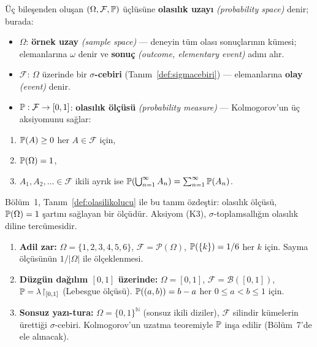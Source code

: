 \begin{tanim}\label{def:olasilikuzayi}
Üç bileşenden oluşan $(\Omega, \mathcal{F}, \mathbb{P})$ üçlüsüne
\textbf{olasılık uzayı} \emph{(probability space)} denir; burada:
\begin{itemize}
  \item $\Omega$: \textbf{örnek uzay} \emph{(sample space)} --- deneyin tüm
        olası sonuçlarının kümesi; elemanlarına $\omega$ denir ve
        \textbf{sonuç} \emph{(outcome, elementary event)} adını alır.
  \item $\mathcal{F}$: $\Omega$ üzerinde bir \textbf{$\sigma$-cebiri}
        (Tanım~\ref{def:sigmacebiri}) --- elemanlarına \textbf{olay} \emph{(event)} denir.
  \item $\mathbb{P}: \mathcal{F} \to [0,1]$: \textbf{olasılık ölçüsü}
        \emph{(probability measure)} --- Kolmogorov'un üç aksiyomunu sağlar:
\end{itemize}
\begin{enumerate}[label=\textbf{(K\arabic*)}]
  \item $\mathbb{P}(A) \geq 0$ her $A \in \mathcal{F}$ için,
  \item $\mathbb{P}(\Omega) = 1$,
  \item $A_1, A_2, \ldots \in \mathcal{F}$ ikili ayrık ise
        $\mathbb{P}\!\left(\bigcup_{n=1}^\infty A_n\right) = \sum_{n=1}^\infty \mathbb{P}(A_n)$.
\end{enumerate}
\end{tanim}

\begin{notkutu}
Bölüm~1, Tanım~\ref{def:olasilikolucu} ile bu tanım özdeştir: olasılık ölçüsü,
$\mathbb{P}(\Omega)=1$ şartını sağlayan bir ölçüdür. Aksiyom (K3),
$\sigma$-toplamsallığın olasılık diline tercümesidir.
\end{notkutu}

\begin{ornek}\label{ex:olasilikorn}
\begin{enumerate}[label=(\alph*)]
  \item \textbf{Adil zar:} $\Omega = \{1,2,3,4,5,6\}$,
        $\mathcal{F} = \mathcal{P}(\Omega)$,
        $\mathbb{P}(\{k\}) = 1/6$ her $k$ için. Sayma ölçüsünün
        $1/|\Omega|$ ile ölçeklenmesi.

  \item \textbf{Düzgün dağılım $[0,1]$ üzerinde:} $\Omega = [0,1]$,
        $\mathcal{F} = \mathcal{B}([0,1])$,
        $\mathbb{P} = \lambda\!\restriction_{[0,1]}$ (Lebesgue ölçüsü).
        $\mathbb{P}((a,b)) = b-a$ her $0 \leq a < b \leq 1$ için.

  \item \textbf{Sonsuz yazı-tura:} $\Omega = \{0,1\}^{\mathbb{N}}$
        (sonsuz ikili diziler), $\mathcal{F}$ silindir kümelerin ürettiği
        $\sigma$-cebiri. Kolmogorov'un uzatma teoremiyle $\mathbb{P}$ inşa edilir
        (Bölüm~7'de ele alınacak).
\end{enumerate}
\end{ornek}

